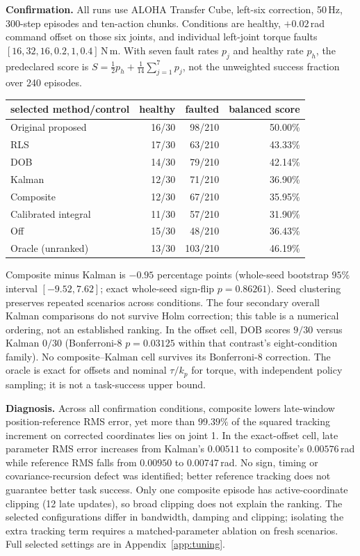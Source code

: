 \documentclass{article}
\begin{document}
\textbf{Confirmation.} All runs use ALOHA Transfer Cube, left-six correction, 50\,Hz,
300-step episodes and ten-action chunks. Conditions are healthy, $+0.02$\,rad command
offset on those six joints, and individual left-joint torque faults
$[16,32,16,0.2,1,0.4]$\,N\,m. With seven fault rates $p_j$ and healthy rate $p_h$, the
predeclared score is $S=\tfrac12p_h+\tfrac1{14}\sum_{j=1}^7p_j$, not the unweighted
success fraction over 240 episodes.
\begin{center}\small
\begin{tabular}{lrrr}
\toprule
selected method/control & healthy & faulted & balanced score \\
\midrule
Original proposed & 16/30 & 98/210 & 50.00\% \\
RLS & 17/30 & 63/210 & 43.33\% \\
DOB & 14/30 & 79/210 & 42.14\% \\
Kalman & 12/30 & 71/210 & 36.90\% \\
Composite & 12/30 & 67/210 & 35.95\% \\
Calibrated integral & 11/30 & 57/210 & 31.90\% \\
\midrule
Off & 15/30 & 48/210 & 36.43\% \\
Oracle (unranked) & 13/30 & 103/210 & 46.19\% \\
\bottomrule
\end{tabular}
\end{center}
Composite minus Kalman is $-0.95$ percentage points (whole-seed bootstrap $95\%$ interval
$[-9.52,7.62]$; exact whole-seed sign-flip $p=0.86261$). Seed clustering preserves repeated
scenarios across conditions. The four secondary overall Kalman comparisons do not survive
Holm correction; this table is a numerical ordering, not an established ranking.
In the offset cell, DOB scores $9/30$ versus Kalman $0/30$ (Bonferroni-8 $p=0.03125$
within that contrast's eight-condition family). No composite--Kalman cell survives its
Bonferroni-8 correction. The oracle is exact for offsets and nominal $\tau/k_p$ for torque,
with independent policy sampling; it is not a task-success upper bound.

\textbf{Diagnosis.} Across all confirmation conditions, composite lowers late-window
position-reference RMS error, yet more than $99.39\%$ of the squared tracking increment
on corrected coordinates lies on joint 1. In the exact-offset cell, late parameter RMS error increases from Kalman's
$0.00511$ to composite's $0.00576$\,rad while reference RMS falls from $0.00950$ to
$0.00747$\,rad. No sign, timing or covariance-recursion defect was identified; better
reference tracking does not guarantee better task success. Only one composite episode
has active-coordinate clipping (12 late updates), so broad clipping does not explain the
ranking. The selected configurations differ in bandwidth, damping and clipping; isolating
the extra tracking term requires a matched-parameter ablation on fresh scenarios.
Full selected settings are in Appendix~\ref{app:tuning}.
\end{document}
